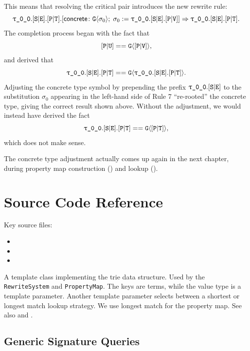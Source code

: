 \documentclass[../generics]{subfiles}
\begin{document}
\begin{example}
This means that resolving the critical pair introduces the new rewrite rule:
\[\rT.\assocsym{S}{E}.\assocsym{P}{T}.\concretesym{\texttt{G}\langle\sigma_0\rangle;\;\sigma_0:=\rT.\assocsym{S}{E}.\assocsym{P}{V}}\Rightarrow\rT.\assocsym{S}{E}.\assocsym{P}{T}.
\]
The completion process began with the fact that
\[[\texttt{P}|\texttt{U}]==\texttt{G}\langle[\texttt{P}|\texttt{V}]\rangle,\]
and derived that\
\[\rT.\assocsym{S}{E}.\assocsym{P}{T}==\texttt{G}\langle\rT.\assocsym{S}{E}.\assocsym{P}{T}\rangle.\]
Adjusting the concrete type symbol by prepending the prefix $\rT.\assocsym{S}{E}$ to the substitution $\sigma_0$ appearing in the left-hand side of Rule 7 ``re-rooted'' the concrete type, giving the correct result shown above. Without the adjustment, we would instead have derived the fact
\[\rT.\assocsym{S}{E}.\assocsym{P}{T}==\texttt{G}\langle\assocsym{P}{T}\rangle,\]
which does not make sense.
\end{example}
The concrete type adjustment actually comes up again in the next chapter, during property map construction () and lookup ().

\section{Source Code Reference}\label{src:property map}

Key source files:
\begin{itemize}
\item {}
\item {}
\item {}
\end{itemize}

A template class implementing the trie data structure. Used by the \texttt{RewriteSystem} and \texttt{PropertyMap}. The keys are terms, while the value type is a template parameter. Another template parameter selects between a shortest or longest match lookup strategy. We use longest match for the property map. See also  and .



\subsection*{Generic Signature Queries}
\end{document}
